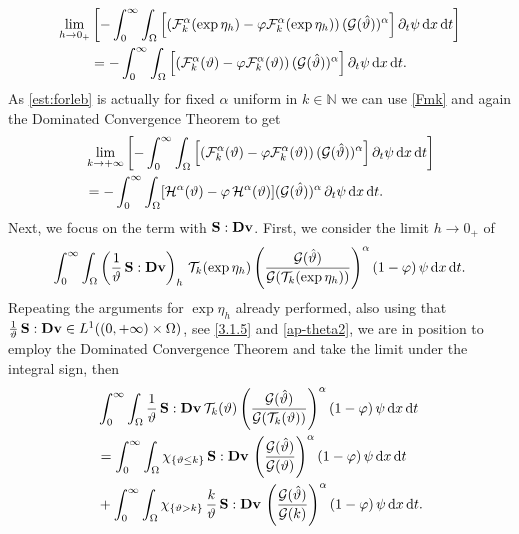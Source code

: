 \documentclass[11pt, a4paper, reqno]{amsart}
\numberwithin{equation}{section}
\newcommand{\dert}{\partial_t}
\newcommand{\thetah}{\hat\thet}
\newcommand{\vc}[1]{{\bf #1}}
\newcommand{\vv}{\vc{v}}
\newcommand{\thet}{\vartheta}
\renewcommand{\S}{\mathbf{S}}
\newcommand{\D}{\mathbf{D}}
\newcommand{\dt}{\,{\rm d} t }
\newcommand{\dx}{\,{\rm d} {x}}
\newcommand{\G}{\mathcal{G}}
\newcommand{\al}{\alpha}
\newcommand{\intnO}[1]{\int_0^{\infty}\intO{ #1 }\dt}
\newcommand{\intO}[1]{\int_{\Omega} #1 \dx}
\begin{document}
\begin{equation*}
\begin{split}
\lim_{h\to 0_+} &\left[ -\intnO{\left[\left( \mathcal{F}_k^\al(\exp{\eta_h}) - \varphi\mathcal{F}_k^\al(\exp{\eta_h})\right)(\G(\thetah))^{\al}\right]\dert\psi}\right]\\
& = - \intnO{\left[\left( \mathcal{F}_k^\al(\thet) - \varphi\mathcal{F}_k^\al(\thet)\right)(\G(\thetah))^{\al}\right]\dert\psi}.
\end{split}
\end{equation*}
As \eqref{est:forleb} is actually for fixed $\alpha$ uniform in $k\in\mathbb{N}$ we can use \eqref{Fmk} and  %
again the Dominated Convergence Theorem to get
\begin{equation*}\begin{split}
&\lim_{k\to +\infty} \left[-\intnO{\left[\left( \mathcal{F}_k^\al(\thet) - \varphi\mathcal{F}_k^\al(\thet)\right)(\G(\thetah))^{\al}\right]\dert\psi}\right]\\
& = - \intnO{[\mathcal{H}^\al(\thet) - \varphi\,\mathcal{H}^\al(\thet)](\G(\thetah))^{\al}\, \dert\psi}.
\end{split}\end{equation*}
Next, we focus on the term with $\S:\D \vv$. First, we consider the limit $h\to 0_+$ of
$$
\intnO{\left(\frac{1}{\thet}\,\S:\D{\vv}\right)_h\, \mathcal{T}_k(\exp{\eta_h}) \left(\frac{\G(\thetah)}{\G(\mathcal{T}_k(\exp{\eta_h}))}\right)^{\al}(1- \varphi)\,\psi}.
$$
Repeating the arguments for $\exp \eta_h$ already performed, also using that $\frac{1}{\thet}\,\S:\D{\vv}\in L^1((0,+\infty)\times\Omega)$, see \eqref{3.1.5} and \eqref{ap-theta2}, we are in position to employ the Dominated Convergence Theorem and take the limit under the integral sign, then
\begin{equation}\label{SD}\begin{split}
 &\intnO{\frac{1}{\thet}\,\S:\D{\vv}\, \mathcal{T}_k(\thet)\left(\frac{\G(\thetah)}{\G(\mathcal{T}_k(\thet))}\right)^{\al} (1- \varphi)\,\psi}
\\& =\intnO{\chi_{\{\thet\leq k\}}\, \S:\D{\vv}\, \left(\frac{\G(\thetah)}{\G(\thet)}\right)^{\al} (1- \varphi)\,\psi}\\&  + \intnO{\chi_{\{\thet> k\}}\,\frac{k}{\thet}\,\S:\D{\vv}\, \left(\frac{\G(\thetah)}{\G(k)}\right)^{\al} (1- \varphi)\,\psi}.
\end{split} \end{equation}
\end{document}
